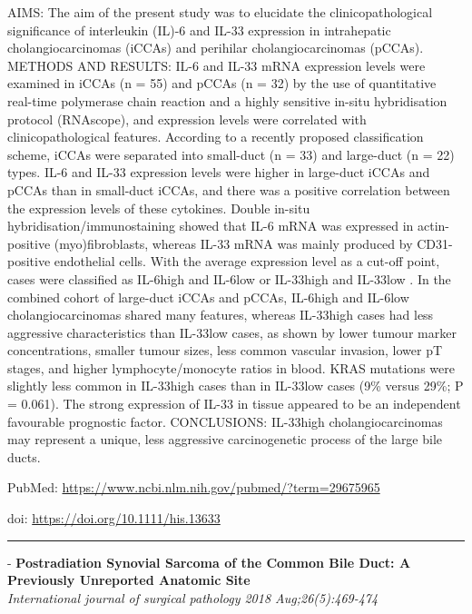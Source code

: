 \documentclass[]{article}
\begin{document}
AIMS: The aim of the present study was to elucidate the
clinicopathological significance of interleukin (IL)-6 and IL-33
expression in intrahepatic cholangiocarcinomas (iCCAs) and perihilar
cholangiocarcinomas (pCCAs). METHODS AND RESULTS: IL-6 and IL-33 mRNA
expression levels were examined in iCCAs (n = 55) and pCCAs (n = 32) by
the use of quantitative real-time polymerase chain reaction and a highly
sensitive in-situ hybridisation protocol (RNAscope), and expression
levels were correlated with clinicopathological features. According to a
recently proposed classification scheme, iCCAs were separated into
small-duct (n = 33) and large-duct (n = 22) types. IL-6 and IL-33
expression levels were higher in large-duct iCCAs and pCCAs than in
small-duct iCCAs, and there was a positive correlation between the
expression levels of these cytokines. Double in-situ
hybridisation/immunostaining showed that IL-6 mRNA was expressed in
actin-positive (myo)fibroblasts, whereas IL-33 mRNA was mainly produced
by CD31-positive endothelial cells. With the average expression level as
a cut-off point, cases were classified as IL-6high and IL-6low or
IL-33high and IL-33low . In the combined cohort of large-duct iCCAs and
pCCAs, IL-6high and IL-6low cholangiocarcinomas shared many features,
whereas IL-33high cases had less aggressive characteristics than
IL-33low cases, as shown by lower tumour marker concentrations, smaller
tumour sizes, less common vascular invasion, lower pT stages, and higher
lymphocyte/monocyte ratios in blood. KRAS mutations were slightly less
common in IL-33high cases than in IL-33low cases (9\% versus 29\%; P =
0.061). The strong expression of IL-33 in tissue appeared to be an
independent favourable prognostic factor. CONCLUSIONS: IL-33high
cholangiocarcinomas may represent a unique, less aggressive
carcinogenetic process of the large bile ducts.

PubMed: \url{https://www.ncbi.nlm.nih.gov/pubmed/?term=29675965}

doi: \url{https://doi.org/10.1111/his.13633}

{}

{}

\begin{center}\rule{0.5\linewidth}{\linethickness}\end{center}

 - \textbf{Postradiation Synovial Sarcoma of the Common Bile Duct: A
Previously Unreported Anatomic Site}\\
 \emph{International journal of surgical pathology 2018
Aug;26(5):469-474}
\end{document}
